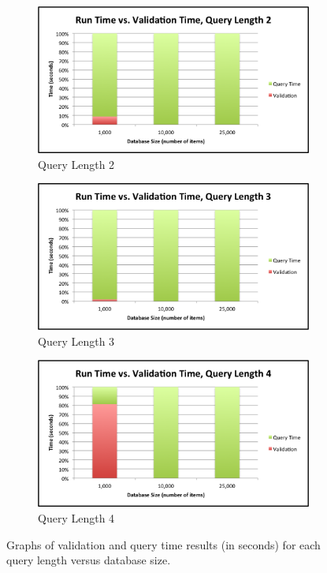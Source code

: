\documentclass{achemso}
\begin{document}
\begin{figure}
\begin{subfigure}[b]{0.45\textwidth}
\centering
\includegraphics[width=\textwidth]{charts/sat_2_graph}
\caption{Query Length 2}
\label{fig:sat2}
\end{subfigure}%
\quad
\begin{subfigure}[b]{0.45\textwidth}
\centering
\includegraphics[width=\textwidth]{charts/sat_3_graph}
\caption{Query Length 3}
\label{fig:sat3}
\end{subfigure}
\quad
\begin{subfigure}[b]{0.45\textwidth}
\centering
\includegraphics[width=\textwidth]{charts/sat_4_graph}
\caption{Query Length 4}
\label{fig:sat4}
\end{subfigure}

\caption{Graphs of validation and query time results (in seconds) for each query length versus database size.}\label{fig:sat-graphs}
\end{figure}
\end{document}
